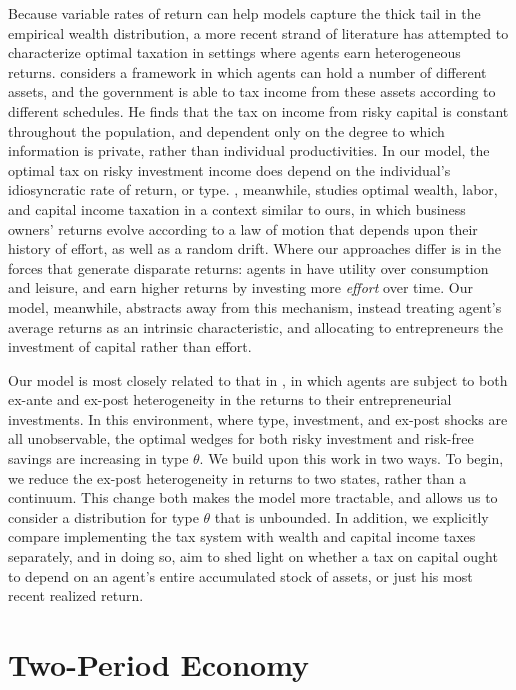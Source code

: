 \documentclass[11pt]{article}
\begin{document}
Because variable rates of return can help models capture the thick tail in the empirical wealth distribution, a more recent strand of literature has attempted to characterize optimal taxation in settings where agents earn heterogeneous returns. \cite{phelan2019differential} considers a framework in which agents can hold a number of different assets, and the government is able to tax income from these assets according to different schedules. He finds that the tax on income from risky capital is constant throughout the population, and dependent only on the degree to which information is private, rather than individual productivities. In our model, the optimal tax on risky investment income does depend on the individual's idiosyncratic rate of return, or type. \cite{phelan2019business}, meanwhile, studies optimal wealth, labor, and capital income taxation in a context similar to ours, in which business owners' returns evolve according to a law of motion that depends upon their history of effort, as well as a random drift. Where our approaches differ is in the forces that generate disparate returns: agents in \cite{phelan2019business} have utility over consumption and leisure, and earn higher returns by investing more \textit{effort} over time. Our model, meanwhile, abstracts away from this mechanism, instead treating agent's average returns as an intrinsic characteristic, and allocating to entrepreneurs the investment of capital rather than effort.   

Our model is most closely related to that in \cite{shourideh2014optimal}, in which agents are subject to both ex-ante and ex-post heterogeneity in the returns to their entrepreneurial investments. In this environment, where type, investment, and ex-post shocks are all unobservable, the optimal wedges for both risky investment and risk-free savings are increasing in type \( \theta \). We build upon this work in two ways. To begin, we reduce the ex-post heterogeneity in returns to two states, rather than a continuum. This change both makes the model more tractable, and allows us to consider a distribution for type \( \theta \) that is unbounded. In addition, we explicitly compare implementing the tax system with wealth and capital income taxes separately, and in doing so, aim to shed light on whether a tax on capital ought to depend on an agent's entire accumulated stock of assets, or just his most recent realized return. 

\section{Two-Period Economy} \label{sec:two_pd}
\end{document}
